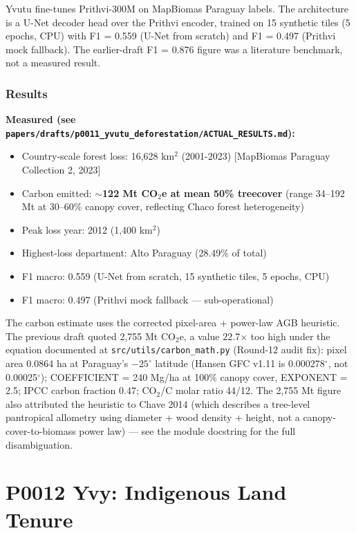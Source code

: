 \documentclass[12pt,a4paper,oneside]{book}
\begin{document}
Yvutu fine-tunes Prithvi-300M on MapBiomas Paraguay labels. The architecture is a U-Net decoder head over the Prithvi encoder, trained on 15 synthetic tiles (5 epochs, CPU) with F1 = 0.559 (U-Net from scratch) and F1 = 0.497 (Prithvi mock fallback). The earlier-draft F1 = 0.876 figure was a literature benchmark, not a measured result.

\subsection{Results}

\textbf{Measured (see \texttt{papers/drafts/p0011\_yvutu\_deforestation/ACTUAL\_RESULTS.md}):}
\begin{itemize}
\item Country-scale forest loss: 16,628 km$^2$ (2001-2023) [MapBiomas Paraguay Collection 2, 2023]
\item Carbon emitted: \textbf{$\sim$122 Mt CO$_2$e at mean 50\% treecover} (range 34--192 Mt at 30--60\% canopy cover, reflecting Chaco forest heterogeneity)
\item Peak loss year: 2012 (1,400 km$^2$)
\item Highest-loss department: Alto Paraguay (28.49\% of total)
\item F1 macro: 0.559 (U-Net from scratch, 15 synthetic tiles, 5 epochs, CPU)
\item F1 macro: 0.497 (Prithvi mock fallback --- sub-operational)
\end{itemize}

The carbon estimate uses the corrected pixel-area + power-law AGB heuristic. The previous draft quoted 2,755 Mt CO$_2$e, a value 22.7$\times$ too high under the equation documented at \texttt{src/utils/carbon\_math.py} (Round-12 audit fix): pixel area 0.0864 ha at Paraguay's $-25^\circ$ latitude (Hansen GFC v1.11 is 0.000278$^\circ$, not 0.00025$^\circ$); COEFFICIENT = 240 Mg/ha at 100\% canopy cover, EXPONENT = 2.5; IPCC carbon fraction 0.47; CO$_2$/C molar ratio 44/12. The 2,755 Mt figure also attributed the heuristic to Chave 2014 (which describes a tree-level pantropical allometry using diameter + wood density + height, not a canopy-cover-to-biomass power law) --- see the module docstring for the full disambiguation.

\chapter{P0012 Yvy: Indigenous Land Tenure}
\label{ch:p0012}
\end{document}
